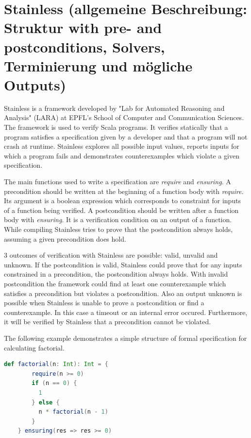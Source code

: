 \section{Stainless (allgemeine Beschreibung: Struktur with pre- and postconditions, Solvers, Terminierung und mögliche Outputs)}
\label{sec:stainless}


Stainless is a framework developed by "Lab for Automated Reasoning and Analysis" (LARA) at EPFL's School of Computer and Communication Sciences. The framework is used to verify Scala programs.
It verifies statically that a program satisfies a specification given by a developer and that a program will not crash at runtime.
Stainless explores all possible input values, reports inputs for which a program fails and demonstrates counterexamples which violate a given specification.\cite{Stainless:introduction}

The main functions used to write a specification are \textit{require} and \textit{ensuring}. 
A precondition should be written at the beginning of a function body with \textit{require}. Its argument is a boolean expression which corresponds to constraint for inputs of a function being verified.
A postcondition should be written after a function body with  \textit{ensuring}. It is a verification condition on an output of a function.
While compiling Stainless tries to prove that the postcondition always holds, assuming a given precondition does hold.\cite{Stainless:introduction}

3 outcomes of verification with Stainless are possible: valid, unvalid and unknown. 
If the postcondition is valid, Stainless could prove that for any inputs constrained in a precondition, the postcondition always holds.
With invalid postcondition the framework could find at least one counterexample which satisfies a precondition but violates a postcondition.
Also an output unknown is possible when Stainless is unable to prove a postcondition or find a counterexample. In this case a timeout or an internal error occured.
Furthermore, it will be verified by Stainless that a precondition cannot be violated.\cite{Stainless:introduction}

The following example demonstrates a simple structure of formal specification for calculating factorial.

\begin{lstlisting}[caption=Example of verifying the function calculating factorial of an integer number, label=listing:factorial, captionpos=b, language=Scala]
    def factorial(n: Int): Int = {
        require(n >= 0)
        if (n == 0) {
          1
        } else {
          n * factorial(n - 1)
        }
    } ensuring(res => res >= 0)
\end{lstlisting}

